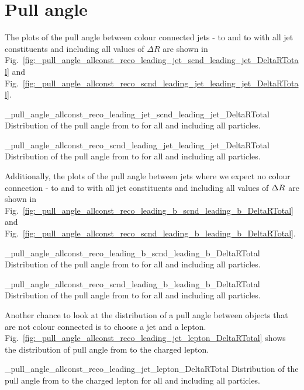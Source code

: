 \section{Pull angle}

The plots of the pull angle between colour connected jets - \leadingjet to \scndleadingjet and \scndleadingjet to \leadingjet with all jet constituents and including all values of $\Delta R$ are shown in Fig.~\ref{fig:_pull_angle_allconst_reco_leading_jet_scnd_leading_jet_DeltaRTotal} and Fig.~\ref{fig:_pull_angle_allconst_reco_scnd_leading_jet_leading_jet_DeltaRTotal}.

          {_pull_angle_allconst_reco_leading_jet_scnd_leading_jet_DeltaRTotal}
          {Distribution of the pull angle from \leadingjet to \scndleadingjet for all \DeltaR and including all particles.}

          {_pull_angle_allconst_reco_scnd_leading_jet_leading_jet_DeltaRTotal}
          {Distribution of the pull angle from \scndleadingjet to \leadingjet for all \DeltaR and including all particles.}

Additionally, the plots of the pull angle between jets where we expect no colour connection - \leadingb to \scndleadingb and \scndleadingb to \leadingb with all jet constituents and including all values of $\Delta R^{} $ are shown in Fig.~\ref{fig:_pull_angle_allconst_reco_leading_b_scnd_leading_b_DeltaRTotal} and Fig.~\ref{fig:_pull_angle_allconst_reco_scnd_leading_b_leading_b_DeltaRTotal}.

          {_pull_angle_allconst_reco_leading_b_scnd_leading_b_DeltaRTotal}
          {Distribution of the pull angle from \leadingb to \scndleadingb for all \DeltaR and including all particles.}

          {_pull_angle_allconst_reco_scnd_leading_b_leading_b_DeltaRTotal}
          {Distribution of the pull angle from \scndleadingb to \leadingb for all \DeltaR and including all particles.}

Another chance to look at the distribution of a pull angle between objects that are not colour connected is to choose a jet and a lepton. Fig.~\ref{fig:_pull_angle_allconst_reco_leading_jet_lepton_DeltaRTotal} shows the distribution of pull angle from \leadingjet to the charged lepton. 

          {_pull_angle_allconst_reco_leading_jet_lepton_DeltaRTotal}
          {Distribution of the pull angle from \leadingjet to the charged lepton for all \DeltaR and including all particles.}

